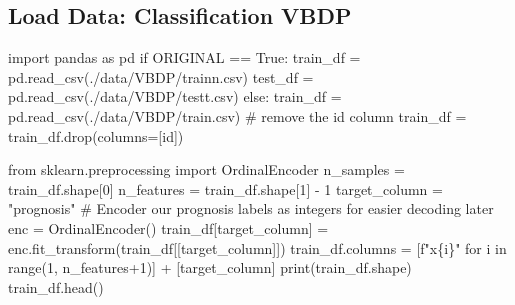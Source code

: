 \documentclass[
  letterpaper,
  DIV=11,
  numbers=noendperiod]{scrreprt}
\newenvironment{Shaded}{\begin{snugshade}}{\end{snugshade}}
\newcommand{\BuiltInTok}[1]{\textcolor[rgb]{0.00,0.23,0.31}{#1}}
\newcommand{\CommentTok}[1]{\textcolor[rgb]{0.37,0.37,0.37}{#1}}
\newcommand{\ControlFlowTok}[1]{\textcolor[rgb]{0.00,0.23,0.31}{#1}}
\newcommand{\DecValTok}[1]{\textcolor[rgb]{0.68,0.00,0.00}{#1}}
\newcommand{\ImportTok}[1]{\textcolor[rgb]{0.00,0.46,0.62}{#1}}
\newcommand{\KeywordTok}[1]{\textcolor[rgb]{0.00,0.23,0.31}{#1}}
\newcommand{\NormalTok}[1]{\textcolor[rgb]{0.00,0.23,0.31}{#1}}
\newcommand{\OperatorTok}[1]{\textcolor[rgb]{0.37,0.37,0.37}{#1}}
\newcommand{\SpecialCharTok}[1]{\textcolor[rgb]{0.37,0.37,0.37}{#1}}
\newcommand{\SpecialStringTok}[1]{\textcolor[rgb]{0.13,0.47,0.30}{#1}}
\newcommand{\StringTok}[1]{\textcolor[rgb]{0.13,0.47,0.30}{#1}}
\newcommand{\VariableTok}[1]{\textcolor[rgb]{0.07,0.07,0.07}{#1}}
\begin{document}
\hypertarget{load-data-classification-vbdp-3}{%
\subsection{Load Data: Classification
VBDP}\label{load-data-classification-vbdp-3}}

\begin{Shaded}
\begin{Highlighting}[]
\ImportTok{import}\NormalTok{ pandas }\ImportTok{as}\NormalTok{ pd}
\ControlFlowTok{if}\NormalTok{ ORIGINAL }\OperatorTok{==} \VariableTok{True}\NormalTok{:}
\NormalTok{    train\_df }\OperatorTok{=}\NormalTok{ pd.read\_csv(}\StringTok{\textquotesingle{}./data/VBDP/trainn.csv\textquotesingle{}}\NormalTok{)}
\NormalTok{    test\_df }\OperatorTok{=}\NormalTok{ pd.read\_csv(}\StringTok{\textquotesingle{}./data/VBDP/testt.csv\textquotesingle{}}\NormalTok{)}
\ControlFlowTok{else}\NormalTok{:}
\NormalTok{    train\_df }\OperatorTok{=}\NormalTok{ pd.read\_csv(}\StringTok{\textquotesingle{}./data/VBDP/train.csv\textquotesingle{}}\NormalTok{)}
    \CommentTok{\# remove the id column}
\NormalTok{    train\_df }\OperatorTok{=}\NormalTok{ train\_df.drop(columns}\OperatorTok{=}\NormalTok{[}\StringTok{\textquotesingle{}id\textquotesingle{}}\NormalTok{])}
\end{Highlighting}
\end{Shaded}

\begin{Shaded}
\begin{Highlighting}[]
\ImportTok{from}\NormalTok{ sklearn.preprocessing }\ImportTok{import}\NormalTok{ OrdinalEncoder}
\NormalTok{n\_samples }\OperatorTok{=}\NormalTok{ train\_df.shape[}\DecValTok{0}\NormalTok{]}
\NormalTok{n\_features }\OperatorTok{=}\NormalTok{ train\_df.shape[}\DecValTok{1}\NormalTok{] }\OperatorTok{{-}} \DecValTok{1}
\NormalTok{target\_column }\OperatorTok{=} \StringTok{"prognosis"}
\CommentTok{\# Encoder our prognosis labels as integers for easier decoding later}
\NormalTok{enc }\OperatorTok{=}\NormalTok{ OrdinalEncoder()}
\NormalTok{train\_df[target\_column] }\OperatorTok{=}\NormalTok{ enc.fit\_transform(train\_df[[target\_column]])}
\NormalTok{train\_df.columns }\OperatorTok{=}\NormalTok{ [}\SpecialStringTok{f"x}\SpecialCharTok{\{}\NormalTok{i}\SpecialCharTok{\}}\SpecialStringTok{"} \ControlFlowTok{for}\NormalTok{ i }\KeywordTok{in} \BuiltInTok{range}\NormalTok{(}\DecValTok{1}\NormalTok{, n\_features}\OperatorTok{+}\DecValTok{1}\NormalTok{)] }\OperatorTok{+}\NormalTok{ [target\_column]}
\BuiltInTok{print}\NormalTok{(train\_df.shape)}
\NormalTok{train\_df.head()}
\end{Highlighting}
\end{Shaded}
\end{document}
